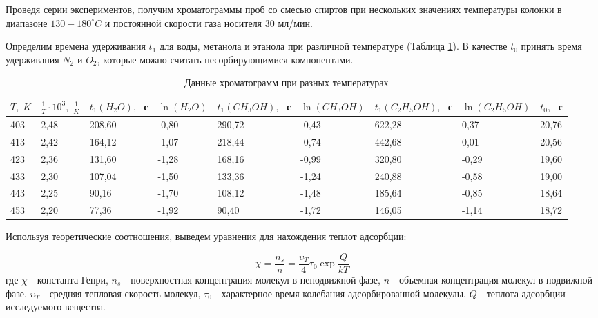 \documentclass{article}
\begin{document}
    \par Проведя серии экспериментов, получим хроматограммы проб со смесью спиртов при нескольких значениях температуры колонки в диапазоне $130 - 180 ^{\circ}C$ и постоянной скорости газа носителя $30$ мл/мин.
    
     Определим времена удерживания $t_1$ для воды, метанола и этанола при различной температуре (Таблица \ref{Разные температуры}). В качестве $t_0$ принять время удерживания $N_2$ и $O_2$, которые можно считать несорбирующимися компонентами.

    \begin{table}[h!]
    \centering
    \caption{Данные хроматограмм при разных температурах}
    \begin{tabular}{|l|l|l|l|l|l|l|l|l|}
    \hline
    $T,\; K$ & $\frac{1}{T}\cdot 10^3,\; \frac{1}{K} $ & $t_1(H_2O),\;$ с & $\ln{(H_2O)}$ & $t_1(CH_3OH),\;$ с & $\ln{(CH_3OH)}$ & $t_1(C_2H_5OH),\;$ с & $\ln{(C_2H_5OH)}$ & $t_0,\;$ с \\ \hline
 403&  2,48& 208,60 
& -0,80
&  290,72&  -0,43&  622,28&  0,37&  20,76 
\\ \hline
 413&  2,42& 164,12 
& 
-1,07
&  218,44&  -0,74&  442,68&  0,01&  20,56 
\\ \hline
 423&  2,36& 131,60 
& -1,28
&  168,16&  -0,99&  320,80&  -0,29&  19,60 
\\ \hline
 433&  2,30& 107,04 
& 
-1,50
&  133,36&  -1,24&  240,88&  -0,58&  19,00 
\\ \hline
 443&  2,25& 90,16 
& -1,70
&  108,12&  -1,48&  185,64&  -0,85&  18,64 
\\ \hline
 453&  2,20& 77,36 & 
-1,92
&  90,40&  -1,72&  146,05&  -1,14&  18,72 \\ \hline
\end{tabular}
\label{Разные температуры}
\end{table}
    Используя теоретические соотношения, выведем уравнения для нахождения теплот адсорбции:
    
    \begin{equation*}
        \chi = \frac{n_s}{n} = \frac{\upsilon_T}{4}\tau_0 \exp{\frac{Q}{kT}}
    \end{equation*}
    где $\chi$ - константа Генри, $n_s$ - поверхностная концентрация молекул в неподвижной фазе, $n$ - объемная концентрация молекул в подвижной фазе, $\upsilon_T$ - средняя тепловая скорость молекул, $\tau_0$ - характерное время колебания адсорбированной молекулы, $Q$ - теплота адсорбции исследуемого вещества.
\end{document}
